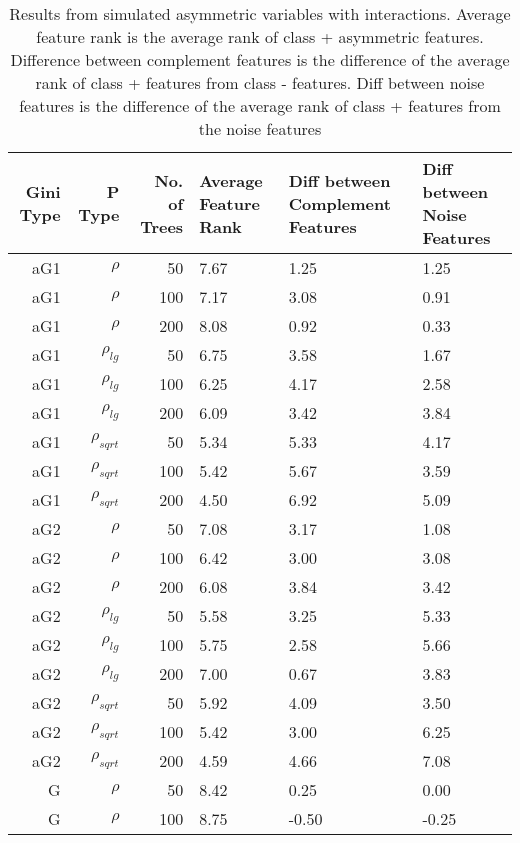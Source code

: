 \documentclass[twoside,11pt]{article}
\begin{document}
\begin{table}%
  \centering
  \caption{Results from simulated asymmetric variables with interactions. Average feature rank is the average rank of class + asymmetric features. Difference between complement features is the difference of the average rank of class + features from class - features. Diff between noise features is the difference of the average rank of class + features from the noise features}
\begin{tabular}{rrrp{2.5cm}p{2.5cm}p{2.5cm}}
\hline
Gini Type & P Type & No. of Trees & Average Feature Rank & Diff between Complement Features & Diff between Noise Features \bigstrut\\
\hline
\renewcommand{\arraystretch}{.5}
aG1   & $\rho$ & 50    & 7.67  & 1.25  & 1.25 \bigstrut[t]\\
aG1   & $\rho$ & 100   & 7.17  & 3.08  & 0.91 \\
aG1   & $\rho$ & 200   & 8.08  & 0.92  & 0.33 \\
aG1   & $\rho_{lg}$ & 50    & 6.75  & 3.58  & 1.67 \\
aG1   & $\rho_{lg}$ & 100   & 6.25  & 4.17  & 2.58 \\
aG1   & $\rho_{lg}$ & 200   & 6.09  & 3.42  & 3.84 \\
aG1   & $\rho_{sqrt}$ & 50    & 5.34  & 5.33  & 4.17 \\
aG1   & $\rho_{sqrt}$ & 100   & 5.42  & 5.67  & 3.59 \\
aG1   & $\rho_{sqrt}$ & 200   & 4.50  & 6.92  & 5.09 \\
aG2   & $\rho$ & 50    & 7.08  & 3.17  & 1.08 \\
aG2   & $\rho$ & 100   & 6.42  & 3.00  & 3.08 \\
aG2   & $\rho$ & 200   & 6.08  & 3.84  & 3.42 \\
aG2   & $\rho_{lg}$ & 50    & 5.58  & 3.25  & 5.33 \\
aG2   & $\rho_{lg}$ & 100   & 5.75  & 2.58  & 5.66 \\
aG2   & $\rho_{lg}$ & 200   & 7.00  & 0.67  & 3.83 \\
aG2   & $\rho_{sqrt}$ & 50    & 5.92  & 4.09  & 3.50 \\
aG2   & $\rho_{sqrt}$ & 100   & 5.42  & 3.00  & 6.25 \\
aG2   & $\rho_{sqrt}$ & 200   & 4.59  & 4.66  & 7.08 \\
G     & $\rho$ & 50    & 8.42  & 0.25  & 0.00 \\
G     & $\rho$ & 100   & 8.75  & -0.50 & -0.25 \\

\end{tabular}
\end{table}
\end{document}
